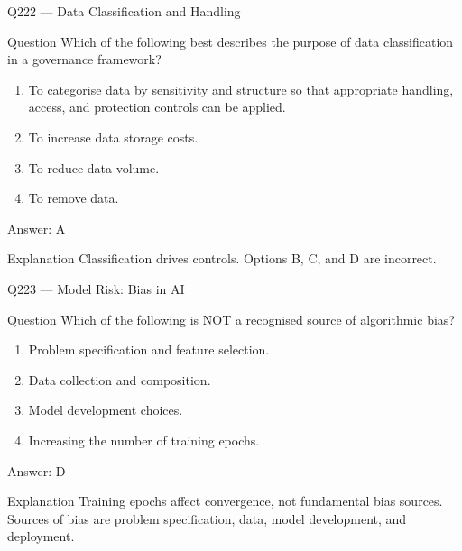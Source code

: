 \documentclass[aspectratio=169,8pt]{beamer}
\begin{document}
																													\begin{frame}{Q222 --- Data Classification and Handling}
																														\begin{block}{Question}
																															Which of the following best describes the purpose of data classification in a governance framework?
																															\begin{enumerate}
																																\item To categorise data by sensitivity and structure so that appropriate handling, access, and protection controls can be applied.
																																\item To increase data storage costs.
																																\item To reduce data volume.
																																\item To remove data.
																															\end{enumerate}  \end{block}
																															\begin{exampleblock}{Answer: A}\end{exampleblock}
																															\begin{block}{Explanation}
																																Classification drives controls. Options B, C, and D are incorrect.
																															\end{block}
																														\end{frame}
																														
																														\begin{frame}{Q223 --- Model Risk: Bias in AI}
																															\begin{block}{Question}
																																Which of the following is NOT a recognised source of algorithmic bias?
																																\begin{enumerate}
																																	\item Problem specification and feature selection.
																																	\item Data collection and composition.
																																	\item Model development choices.
																																	\item Increasing the number of training epochs.
																																\end{enumerate}  \end{block}
																																\begin{exampleblock}{Answer: D}\end{exampleblock}
																																\begin{block}{Explanation}
																																	Training epochs affect convergence, not fundamental bias sources. Sources of bias are problem specification, data, model development, and deployment.
																																\end{block}
																															\end{frame}
																															
\end{document}
